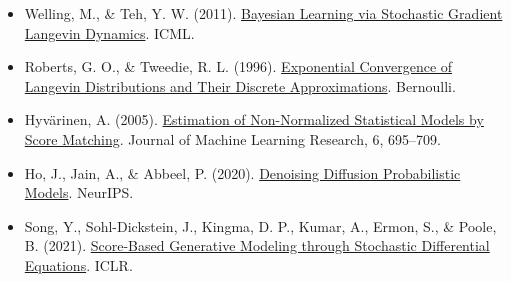 \vspace{0.25em}
\begin{itemize}
\tightlist
\item
  Welling, M., \& Teh, Y. W. (2011). \href{https://www.stats.ox.ac.uk/~teh/research/compstats/WelTeh2011a.pdf}{Bayesian Learning via Stochastic Gradient Langevin Dynamics}. ICML.
\item
  Roberts, G. O., \& Tweedie, R. L. (1996). \href{https://doi.org/10.2307/3318418}{Exponential Convergence of Langevin Distributions and Their Discrete Approximations}. Bernoulli.
\item
  Hyvärinen, A. (2005). \href{https://www.jmlr.org/papers/v6/hyvarinen05a.html}{Estimation of Non-Normalized Statistical Models by Score Matching}. Journal of Machine Learning Research, 6, 695--709.
\item
  Ho, J., Jain, A., \& Abbeel, P. (2020). \href{https://arxiv.org/abs/2006.11239}{Denoising Diffusion Probabilistic Models}. NeurIPS.
\item
  Song, Y., Sohl-Dickstein, J., Kingma, D. P., Kumar, A., Ermon, S., \& Poole, B. (2021). \href{https://arxiv.org/abs/2011.13456}{Score-Based Generative Modeling through Stochastic Differential Equations}. ICLR.
\end{itemize}

\clearpage
